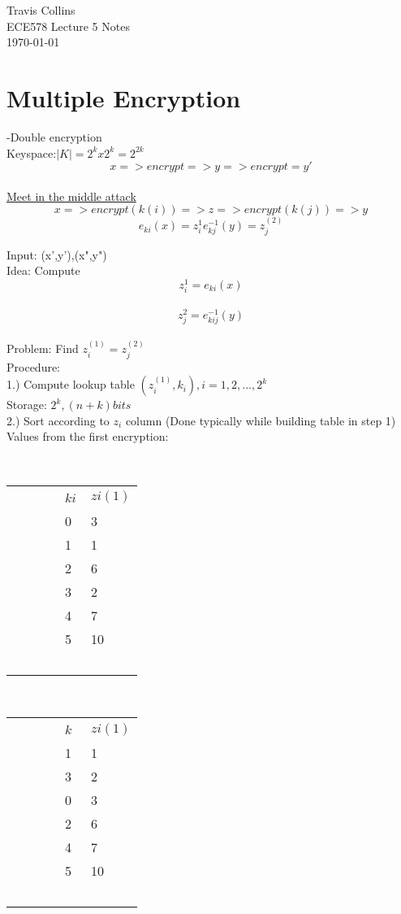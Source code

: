 \documentclass[12pt,letterpaper]{article}
\begin{document}
\linespread{1} %
\small \normalsize %
\begin{flushright}
Travis Collins \\
ECE578 Lecture 5 Notes \\
\today
\end{flushright}

\section{Multiple Encryption}
-Double encryption\\
Keyspace:\(\left|K\right|=2^k x 2^k=2^{2k}  \)\\
\[x => encrypt => y => encrypt =y'\]\\

\underline{Meet in the middle attack}\\
\[ x => encrypt(k(i)) => z => encrypt(k(j)) => y\]
\[e_{ki}(x)=z_{i}^1  e_{kj}^{-1}(y)=z_{j}^(2)\]

Input: (x',y'),(x",y")\\
Idea: Compute
\[z_{i}^1=e_{ki}(x)\]\\
\[z_{j}^2=e_{kij}^{-1}(y)\]\\
Problem: Find \(z_{i}^(1)=z_{j}^(2)\)\\

Procedure:\\
1.) Compute lookup table \((z_{i}^{(1)},k_{i}),i=1,2,...,2^k\)\\
Storage: \(2^k,(n+k) bits\)\\
2.) Sort according to \(z_{i}\) column (Done typically while building table in step 1) \\

Values from the first encryption:\\
\begin{table}
    \begin{tabular}{|l|l|}
        $ki$ & $zi(1)$ \\ 
        0  & 3     \\ 
        1  & 1     \\ 
        2  & 6     \\ 
        3  & 2     \\ 
        4  & 7     \\ 
        5  & 10    \\
    \end{tabular}
\end{table}

\begin{table}
    \begin{tabular}{|l|l|}
        $k$ & $zi(1)$ \\
        1  & 1     \\ 
        3  & 2     \\ 
        0  & 3     \\ 
        2  & 6     \\ 
        4  & 7     \\ 
        5  & 10    \\
    \end{tabular}
\end{table}
\end{document}
